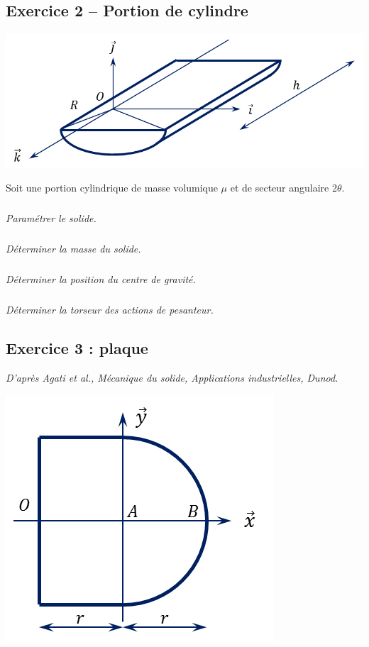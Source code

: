\documentclass[10pt,fleqn]{article} %
\begin{document}
\begin{multicols}{2}
\subsection*{Exercice 2 -- Portion de cylindre}
\setcounter{exo}{0}
\begin{center}
\includegraphics[width=\linewidth]{images/portioncylindre}
\end{center}

Soit une portion cylindrique de masse volumique $\mu$ et de secteur angulaire 2$\theta$.

\subparagraph{}
\textit{Paramétrer le solide.}
\subparagraph{}
\textit{Déterminer la masse du solide.}

\subparagraph{}
\textit{Déterminer la position du centre de gravité.}

\subparagraph{}
\textit{Déterminer la torseur des actions de pesanteur.}




\subsection*{Exercice 3 : plaque}
\setcounter{exo}{0}
\begin{flushright}
\textit{D'après Agati et al., Mécanique du solide, Applications industrielles, Dunod.}
\end{flushright}
\setcounter{subparagraph}{0}

\begin{center}
\includegraphics[width=.65\linewidth]{images/plaque}
\end{center}


\end{multicols}
\end{document}
